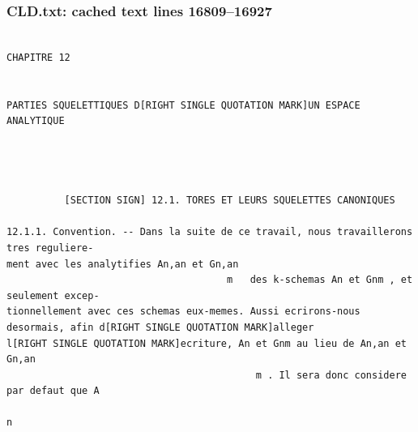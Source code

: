 \documentclass[
  11pt,
]{article}
\begin{document}
\subsubsection{CLD.txt: cached text lines
16809--16927}\label{cld.txt-cached-text-lines-1680916927}

\begin{lstlisting}

CHAPITRE 12


PARTIES SQUELETTIQUES D[RIGHT SINGLE QUOTATION MARK]UN ESPACE
ANALYTIQUE




          [SECTION SIGN] 12.1. TORES ET LEURS SQUELETTES CANONIQUES

12.1.1. Convention. -- Dans la suite de ce travail, nous travaillerons tres reguliere-
ment avec les analytifies An,an et Gn,an
                                      m   des k-schemas An et Gnm , et seulement excep-
tionnellement avec ces schemas eux-memes. Aussi ecrirons-nous desormais, afin d[RIGHT SINGLE QUOTATION MARK]alleger
l[RIGHT SINGLE QUOTATION MARK]ecriture, An et Gnm au lieu de An,an et Gn,an
                                           m . Il sera donc considere par defaut que A
                                                                                        n


\end{lstlisting}
\end{document}
